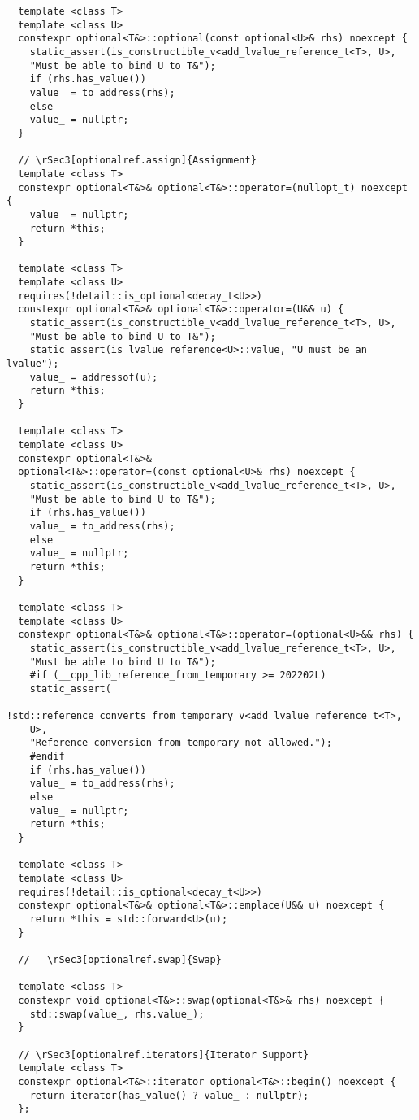 \documentclass[a4paper,10pt,oneside,openany,final,article]{memoir}
\begin{document}
\begin{verbatim}
  template <class T>
  template <class U>
  constexpr optional<T&>::optional(const optional<U>& rhs) noexcept {
    static_assert(is_constructible_v<add_lvalue_reference_t<T>, U>,
    "Must be able to bind U to T&");
    if (rhs.has_value())
    value_ = to_address(rhs);
    else
    value_ = nullptr;
  }

  // \rSec3[optionalref.assign]{Assignment}
  template <class T>
  constexpr optional<T&>& optional<T&>::operator=(nullopt_t) noexcept {
    value_ = nullptr;
    return *this;
  }

  template <class T>
  template <class U>
  requires(!detail::is_optional<decay_t<U>>)
  constexpr optional<T&>& optional<T&>::operator=(U&& u) {
    static_assert(is_constructible_v<add_lvalue_reference_t<T>, U>,
    "Must be able to bind U to T&");
    static_assert(is_lvalue_reference<U>::value, "U must be an lvalue");
    value_ = addressof(u);
    return *this;
  }

  template <class T>
  template <class U>
  constexpr optional<T&>&
  optional<T&>::operator=(const optional<U>& rhs) noexcept {
    static_assert(is_constructible_v<add_lvalue_reference_t<T>, U>,
    "Must be able to bind U to T&");
    if (rhs.has_value())
    value_ = to_address(rhs);
    else
    value_ = nullptr;
    return *this;
  }

  template <class T>
  template <class U>
  constexpr optional<T&>& optional<T&>::operator=(optional<U>&& rhs) {
    static_assert(is_constructible_v<add_lvalue_reference_t<T>, U>,
    "Must be able to bind U to T&");
    #if (__cpp_lib_reference_from_temporary >= 202202L)
    static_assert(
    !std::reference_converts_from_temporary_v<add_lvalue_reference_t<T>,
    U>,
    "Reference conversion from temporary not allowed.");
    #endif
    if (rhs.has_value())
    value_ = to_address(rhs);
    else
    value_ = nullptr;
    return *this;
  }

  template <class T>
  template <class U>
  requires(!detail::is_optional<decay_t<U>>)
  constexpr optional<T&>& optional<T&>::emplace(U&& u) noexcept {
    return *this = std::forward<U>(u);
  }

  //   \rSec3[optionalref.swap]{Swap}

  template <class T>
  constexpr void optional<T&>::swap(optional<T&>& rhs) noexcept {
    std::swap(value_, rhs.value_);
  }

  // \rSec3[optionalref.iterators]{Iterator Support}
  template <class T>
  constexpr optional<T&>::iterator optional<T&>::begin() noexcept {
    return iterator(has_value() ? value_ : nullptr);
  };


\end{verbatim}
\end{document}
